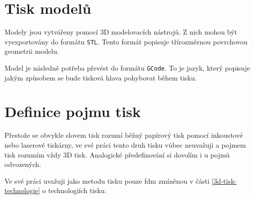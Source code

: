 \section{Tisk modelů}

Modely jsou vytvářeny pomocí 3D modelovacích nástrojů.
Z nich mohou být vyexportovány do formátu \texttt{STL}.
Tento formát popisuje třírozměrnou povrchovou geometrii modelu. \cite{3dtisk-stl}

Model je následně potřeba převést do formátu \texttt{GCode}.
To je jazyk, který popisuje jakým způsobem se bude tisková hlava pohybovat během tisku. \cite{reprap-gcode}

\section{Definice pojmu tisk}\label{3d-tisk-definice-pojmu}

Přestože se obvykle slovem tisk rozumí běžný papírový tisk pomocí inkoustové nebo laserové tiskárny,
ve své práci tento druh tisku vůbec neuvažuji a pojmem tisk rozumím vždy 3D tisk.
Analogické předefinování si dovolím i u pojmů odvozených.

Ve své práci uvažuji jako metodu tisku pouze \acrshort{fdm} zmíněnou v části \ref{3d-tisk-technologie} o technologiích tisku.
